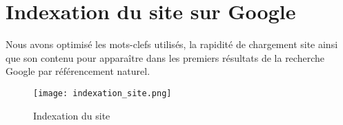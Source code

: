 \documentclass[
	article,			%
	11pt,				%
	oneside,			%
	a4paper,			%
	chapter=TITLE,
	french,			%
	sumario=tradicional
	]{base_nt}
\begin{document}
\section{Indexation du site sur Google}

Nous avons optimisé les mots-clefs utilisés, la rapidité de chargement site ainsi que son contenu pour apparaître dans les premiers résultats de la recherche Google par référencement naturel.

\vspace{0cm}
\begin{figure}[ht]
	\caption{Indexation du site}
	\centering
	\texttt{[image: indexation\_site.png]}
	
\end{figure}
\end{document}
